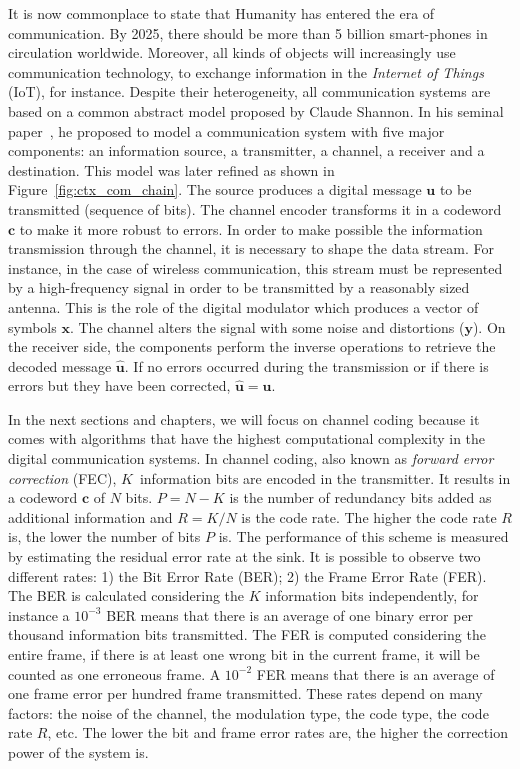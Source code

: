 It is now commonplace to state that Humanity has entered the era of
communication. By 2025, there should be more than 5 billion smart-phones in
circulation worldwide. Moreover, all kinds of objects will increasingly use
communication technology, to exchange information in the \emph{Internet of
Things} (IoT), for instance. Despite their heterogeneity, all communication
systems are based on a common abstract model proposed by Claude Shannon. In his
seminal paper~\cite{Shannon1948}, he proposed to model a communication system
with five major components: an information source, a transmitter, a channel, a
receiver and a destination. This model was later refined as shown in
Figure~\ref{fig:ctx_com_chain}. The source produces a digital message $\bm{u}$
to be transmitted (sequence of bits). The channel encoder transforms it in a
codeword $\bm{c}$ to make it more robust to errors. In order to make possible
the information transmission through the channel, it is necessary to shape the
data stream. For instance, in the case of wireless communication, this stream
must be represented by a high-frequency signal in order to be transmitted by a
reasonably sized antenna. This is the role of the digital modulator which
produces a vector of symbols $\bm{x}$. The channel alters the signal with some
noise and distortions ($\bm{y}$). On the receiver side, the components perform
the inverse operations to retrieve the decoded message $\bm{\hat{u}}$. If no
errors occurred during the transmission or if there is errors but they have been
corrected, $\bm{\hat{u}} = \bm{u}$.

In the next sections and chapters, we will focus on channel coding because it
comes with algorithms that have the highest computational complexity in the
digital communication systems. In channel coding, also known as \emph{forward
error correction} (FEC), $K$~information bits  are encoded in the transmitter.
It results in a codeword $\bm{c}$ of $N$ bits. $P = N - K$ is the number of
redundancy bits added as additional information and $R = K/N$ is the code rate.
The higher the code rate $R$ is, the lower the number of bits $P$ is. The
performance of this scheme is measured by estimating the residual error rate at
the sink. It is possible to observe two different rates: 1) the Bit Error Rate
(BER); 2) the Frame Error Rate (FER). The BER is calculated considering the $K$
information bits independently, for instance a $10^{-3}$ BER means that there is
an average of one binary error per thousand information bits transmitted. The
FER is computed considering the entire frame, if there is at least one wrong bit
in the current frame, it will be counted as one erroneous frame. A $10^{-2}$ FER
means that there is an average of one frame error per hundred frame transmitted.
These rates depend on many factors: the noise of the channel, the modulation
type, the code type, the code rate $R$, etc. The lower the bit and frame error
rates are, the higher the correction power of the system is.

